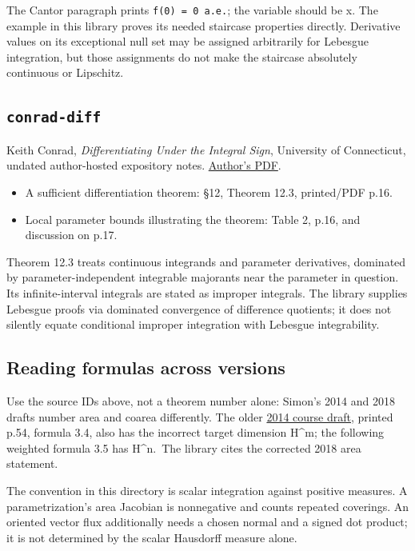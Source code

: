 \documentclass[
  11pt,
]{article}
\providecommand{\tightlist}{%
  \setlength{\itemsep}{0pt}\setlength{\parskip}{0pt}}
\begin{document}
The Cantor paragraph prints \texttt{f\textquotesingle{}(0)\ =\ 0\ a.e.};
the variable should be x. The example in this library proves its needed
staircase properties directly. Derivative values on its exceptional null
set may be assigned arbitrarily for Lebesgue integration, but those
assignments do not make the staircase absolutely continuous or
Lipschitz.

\subsection{\texorpdfstring{\texttt{conrad-\allowbreak{}diff}}{conrad-diff}}\label{conrad-diff}

Keith Conrad, \emph{Differentiating Under the Integral Sign}, University
of Connecticut, undated author-hosted expository notes.
\href{https://kconrad.math.uconn.edu/blurbs/analysis/diffunderint.pdf}{Author's
PDF}.

\begin{itemize}
\tightlist
\item
  A sufficient differentiation theorem: §12, Theorem 12.3, printed/PDF
  p.16.
\item
  Local parameter bounds illustrating the theorem: Table 2, p.16, and
  discussion on p.17.
\end{itemize}

Theorem 12.3 treats continuous integrands and parameter derivatives,
dominated by parameter-independent integrable majorants near the
parameter in question. Its infinite-interval integrals are stated as
improper integrals. The library supplies Lebesgue proofs via dominated
convergence of difference quotients; it does not silently equate
conditional improper integration with Lebesgue integrability.

\subsection{Reading formulas across
versions}\label{reading-formulas-across-versions}

Use the source IDs above, not a theorem number alone: Simon's 2014 and
2018 drafts number area and coarea differently. The older
\href{https://web.stanford.edu/class/math285/ts-gmt.pdf}{2014 course
draft}, printed p.54, formula 3.4, also has the incorrect target
dimension H\^{}m; the following weighted formula 3.5 has H\^{}n.~The
library cites the corrected 2018 area statement.

The convention in this directory is scalar integration against positive
measures. A parametrization's area Jacobian is nonnegative and counts
repeated coverings. An oriented vector flux additionally needs a chosen
normal and a signed dot product; it is not determined by the scalar
Hausdorff measure alone.
\end{document}
